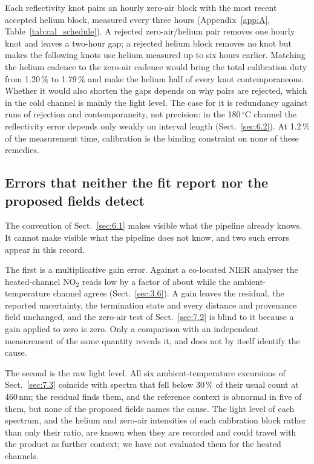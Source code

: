 Each reflectivity knot pairs an hourly zero-air block with the most recent accepted helium block, measured every three
hours (Appendix~\ref{app:A}, Table~\ref{tab:cal_schedule}). A rejected zero-air/helium pair removes one hourly knot and leaves a two-hour gap; a rejected
helium block removes no knot but makes the following knots use helium measured up to six hours earlier. Matching the
helium cadence to the zero-air cadence would bring the total calibration duty from 1.20\,\% to 1.79\,\% and make the
helium half of every knot contemporaneous. Whether it would also shorten the gaps depends on why pairs are rejected,
which in the cold channel is mainly the light level. The case for it is redundancy against runs of rejection and
contemporaneity, not precision: in the 180\,$^{\circ}$C channel the reflectivity error depends only weakly on interval
length (Sect.~\ref{sec:6.2}). At 1.2\,\% of the measurement time, calibration is the binding constraint on none of these
remedies.

\subsection{Errors that neither the fit report nor the proposed fields detect}
\label{sec:6.5}

The convention of Sect.~\ref{sec:6.1} makes visible what the pipeline already knows. It cannot make visible what the
pipeline does not know, and two such errors appear in this record.

The first is a multiplicative gain error. Against a co-located NIER analyser the heated-channel NO$_2$ reads low by a
factor of about  while the ambient-temperature channel agrees (Sect.~\ref{sec:3.6}). A gain leaves the residual, the
reported uncertainty, the termination state and every distance and provenance field unchanged, and the zero-air test
of Sect.~\ref{sec:7.2} is blind to it because a gain applied to zero is zero. Only a comparison with an independent
measurement of the same quantity reveals it, and does not by itself identify the cause.

The second is the raw light level. All six ambient-temperature excursions of Sect.~\ref{sec:7.3} coincide with spectra
that fell below 30\,\% of their usual count at 460\,nm; the residual finds them, and the reference context is abnormal
in five of them, but none of the proposed fields names the cause. The light level of each spectrum, and the helium and
zero-air intensities of each calibration block rather than only their ratio, are known when they are recorded and
could travel with the product as further context; we have not evaluated them for the heated channels.
